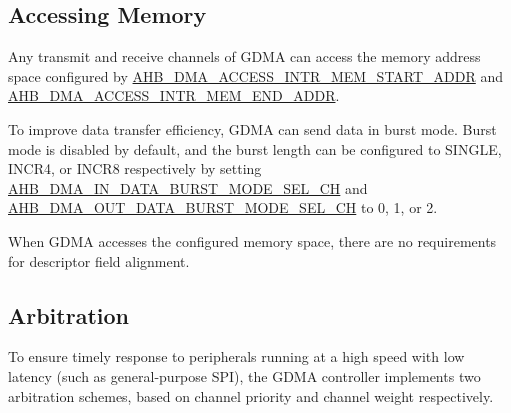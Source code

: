 \documentclass[main\_\_EN.tex]{subfiles}
\begin{document}
\subsection{Accessing Memory}\label{sec:dma-access-inter-ram}

Any transmit and receive channels of GDMA can access the memory address space configured by \hyperref[fielddesc:AHBDMAACCESSINTRMEMSTARTADDR]{AHB\_DMA\_ACCESS\_INTR\_MEM\_START\_ADDR} and \hyperref[fielddesc:AHBDMAACCESSINTRMEMENDADDR]{AHB\_DMA\_ACCESS\_INTR\_MEM\_END\_ADDR}.

To improve data transfer efficiency, GDMA can send data in burst mode. Burst mode is disabled by default, and the burst length can be configured to SINGLE, INCR4, or INCR8 respectively by setting \hyperref[fielddesc:AHBDMAINDATABURSTMODESELCHN]{AHB\_DMA\_IN\_DATA\_BURST\_MODE\_SEL\_CH} and \hyperref[fielddesc:AHBDMAOUTDATABURSTMODESELCHN]{AHB\_DMA\_OUT\_DATA\_BURST\_MODE\_SEL\_CH} to 0, 1, or 2.

When GDMA accesses the configured memory space, there are no requirements for descriptor field alignment.


\subsection{Arbitration}

To ensure timely response to peripherals running at a high speed with low latency (such as general-purpose SPI), the GDMA controller implements two arbitration schemes, based on channel priority and channel weight respectively.
\end{document}
